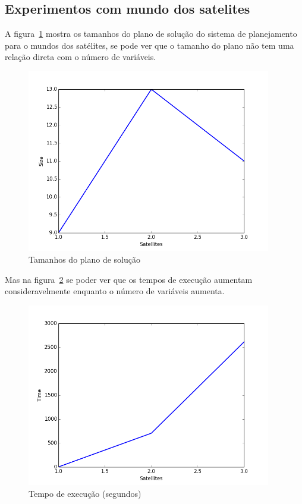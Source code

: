  \subsection{Experimentos com mundo dos satelites}
\label{subsec:expsatelites}
	A figura~\ref{fig:satsize} mostra os tamanhos do plano de solução do sistema de planejamento para o mundos dos satélites, se pode ver que o tamanho do plano não tem uma relação direta com o número de variáveis.
		\begin{figure}[H]
			\centering
			\includegraphics[height=8cm]{images/satellites-size}
			\caption{Tamanhos do plano de solução}
			\label{fig:satsize}
		\end{figure}
	Mas na figura~\ref{fig:sattime} se poder ver que os tempos de execução aumentam consideravelmente enquanto o número de variáveis aumenta.
		\begin{figure}[H]
			\centering
			\includegraphics[height=8cm]{images/satellites-time}
			\caption{Tempo de execução (segundos)}
			\label{fig:sattime}
		\end{figure}
